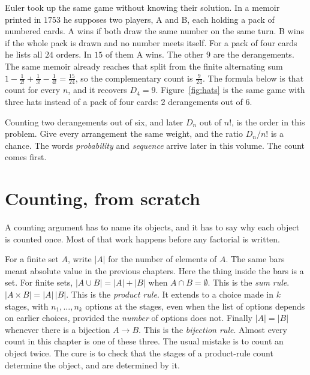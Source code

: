 Euler took up the same game without knowing their solution. In a memoir printed in $1753$ he supposes two players, A and B, each holding a pack of numbered cards. A wins if both draw the same number on the same turn. B wins if the whole pack is drawn and no number meets itself. For a pack of four cards he lists all $24$ orders. In $15$ of them A wins. The other $9$ are the derangements. The same memoir already reaches that split from the finite alternating sum $1-\frac1{2!}+\frac1{3!}-\frac1{4!}=\frac{15}{24}$, so the complementary count is $\frac9{24}$. The formula below is that count for every $n$, and it recovers $D_4=9$. Figure~\ref{fig:hats} is the same game with three hats instead of a pack of four cards: $2$ derangements out of $6$.


Counting two derangements out of six, and later $D_n$ out of $n!$, is the order in this problem. Give every arrangement the same weight, and the ratio $D_n/n!$ is a chance. The words \emph{probability} and \emph{sequence} arrive later in this volume. The count comes first.

\section{Counting, from scratch}

A counting argument has to name its objects, and it has to say why each object is counted once. Most of that work happens before any factorial is written.

\begin{definitionx}
For a finite set $A$, write $|A|$ for the number of elements of $A$. The same bars meant absolute value in the previous chapters. Here the thing inside the bars is a set. For finite sets, $|A\cup B|=|A|+|B|$ when $A\cap B=\emptyset$. This is the \emph{sum rule}.
$|A\times B|=|A|\,|B|$. This is the \emph{product rule}. It extends to a choice made in $k$ stages, with $n_1,\dots,n_k$ options at the stages, even when the list of options depends on earlier choices, provided the \emph{number} of options does not. Finally $|A|=|B|$ whenever there is a bijection $A\to B$. This is the \emph{bijection rule}.
Almost every count in this chapter is one of these three. The usual mistake is to count an object twice. The cure is to check that the stages of a product-rule count determine the object, and are determined by it.
\end{definitionx}

